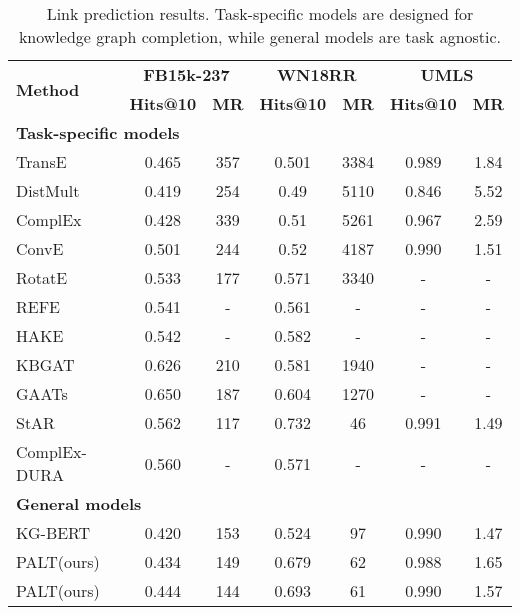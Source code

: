 \documentclass[11pt]{article}
\newcommand{\electricblue}[1]{\textcolor{mediumelectricblue}{#1}}
\newcommand{\method}{\textsc{PALT}}
\newcommand{\methodLarge}{\method}
\begin{document}
\begin{table*}[!htb]
\centering
\resizebox{0.8\linewidth}{!}
  {
    \begin{tabular}{l|cc|cc|cc}
    \toprule
   \multirow{2}{*}{{\bf Method}}  & \multicolumn{2}{c|}{{\bf FB15k-237}}  &\multicolumn{2}{c|}{{\bf WN18RR}} &  \multicolumn{2}{c}{{\bf UMLS}}\\
&{\bf Hits@10} & {\bf MR} &  {\bf Hits@10} & {\bf MR} &{\bf Hits@10} & {\bf MR}  \\ 
    \hline
   \multicolumn{7}{l}{{\bf Task-specific models}} \\
    \hline
    TransE~\cite{TransE} & 0.465 & 357 &  0.501 & 3384 & 0.989 & 1.84 \\
    DistMult~\cite{DistMult}& 0.419 & 254 &  0.49 & 5110 &  0.846 & 5.52 \\
    ComplEx~\cite{trouillon_complex_2016}& 0.428 & 339 &  0.51 & 5261 & 0.967 & 2.59\\
    ConvE~\cite{ConvE}& 0.501 & 244 & 0.52 & 4187 & 0.990&1.51 \\
    RotatE~\cite{RotateE} & 0.533 & 177 & 0.571 & 3340 & -&- \\
    REFE~\cite{chami-etal-2020-low}& 0.541 & - & 0.561 & - & - &- \\
    HAKE~\cite{zhang_learning_2019}& 0.542 & -  & 0.582 & -  & - & - \\ 
    KBGAT~\cite{nathani-etal-2019-learning}&  0.626 & 210 &0.581 & 1940 &  - & - \\ 
    GAATs~\cite{wang_knowledge_2020}&  0.650 & 187 & 0.604 & 1270 & - & -\\ 
   StAR~\cite{wang_structure-augmented_2021}& 0.562 &   117 &   0.732 &   46 &  0.991  &1.49 \\ 
    ComplEx-DURA~\cite{NEURIPS2020_f6185f0e}& 0.560 & - & 0.571 & -  & - & -\\ 
    \hline
    \hline
    \multicolumn{7}{l}{{\bf General models}} \\
    \hline
    KG-BERT~\cite{KGBERT}& 0.420 & 153 &  0.524 & 97 & 0.990 &   1.47\\ 
\hdashline
    \method (\electricblue{\small ours})&0.434 & 149 & 0.679 & 62 & 0.988  & 1.65\\
\methodLarge (\electricblue{\small ours})&0.444 & 144 & 0.693 & 61 & 0.990 & 1.57\\
\hline
    \end{tabular}}
    \caption{Link prediction results. Task-specific models are designed for knowledge graph completion, while general models are task agnostic.}
    \label{tab:lp_results}
\end{table*}
\end{document}
